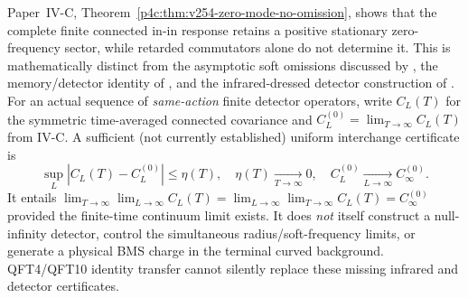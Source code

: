 \documentclass[12pt,a4paper]{article}
\begin{document}
\begin{remark}
\label{p12:rem:v254-static-noise-limit-gate}
Paper~IV-C, Theorem~\ref{p4c:thm:v254-zero-mode-no-omission},
shows that the complete finite connected in-in response retains a
positive stationary zero-frequency sector, while retarded commutators
alone do not determine it. This is mathematically distinct from the
asymptotic soft omissions discussed by
\cite{JorstadPasterski2026SoftOmissions}, the memory/detector identity of
\cite{MoultNarayananPasterski2026MemoryCorrelators}, and the
infrared-dressed detector construction of
\cite{OertelMoultPasterski2026Detectors}.
For an actual sequence of \emph{same-action} finite detector operators,
write $C_L(T)$ for the symmetric time-averaged connected covariance and
$C_L^{(0)}=\lim_{T\to\infty}C_L(T)$ from IV-C. A sufficient (not
currently established) uniform interchange certificate is
\[
\sup_L|C_L(T)-C_L^{(0)}|\le\eta(T),\quad
\eta(T)\xrightarrow[T\to\infty]{}0,\quad
C_L^{(0)}\xrightarrow[L\to\infty]{}C_\infty^{(0)}.
\]
It entails $\lim_{T\to\infty}\lim_{L\to\infty}C_L(T)=
\lim_{L\to\infty}\lim_{T\to\infty}C_L(T)=C_\infty^{(0)}$
provided the finite-time continuum limit exists. It does
\emph{not} itself construct a null-infinity detector, control the
simultaneous radius/soft-frequency limits, or generate a physical BMS
charge in the terminal curved background. QFT4/QFT10 identity transfer
cannot silently replace these missing infrared and detector certificates.
\end{remark}
\end{document}
